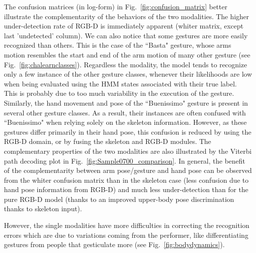 %
The confusion matrices (in log-form)
 in Fig.~\ref{fig:confusion_matrix} better illustrate the complementarity of the behaviors of the two modalities.
%
The higher under-detection rate of RGB-D is immediately apparent (whiter matrix, except last 'undetected' column).
%
We can also notice that some gestures are more easily recognized than others.
This is the case  of the ``Basta" gesture,
whose arms motion  resembles the  start and end of the arm motion of many other gesture (see Fig.~\ref{fig:chalearnclasses}).
Regardless the modality, the model tends to recognize only a few instance of the other gesture classes, whenever their likelihoods are low when being evaluated using the HMM states associated with their true label. This is probably due to too much variability in the execution of the gesture.
%
Similarly, the hand movement and pose of the ``Buenissimo" gesture is present in several other gesture classes. As a result, their instances are often confused with ``Buenissimo" when relying solely on the skeleton information.
%
However, as these gestures differ primarily in their hand pose, this confusion is reduced by using the RGB-D domain, or by fusing  the skeleton and RGB-D modules.
%
The complementary properties of the two modalities are also illustrated by the Viterbi path decoding plot in Fig.~\ref{fig:Sample0700_comparison}.
In general, the benefit of the complementarity between arm pose/gesture and hand pose
can be observed from the whiter confusion matrix than in the skeleton case (less confusion due to hand pose information from RGB-D)
and much less under-detection than for the pure RGB-D model (thanks to an improved upper-body pose discrimination thanks to skeleton input).
%

However, the single modalities  have more difficulties in correcting the recognition errors which are due to variations coming from the performer,
like differentiating  gestures from people that gesticulate more (see Fig.~\ref{fig:bodydynamics}).

